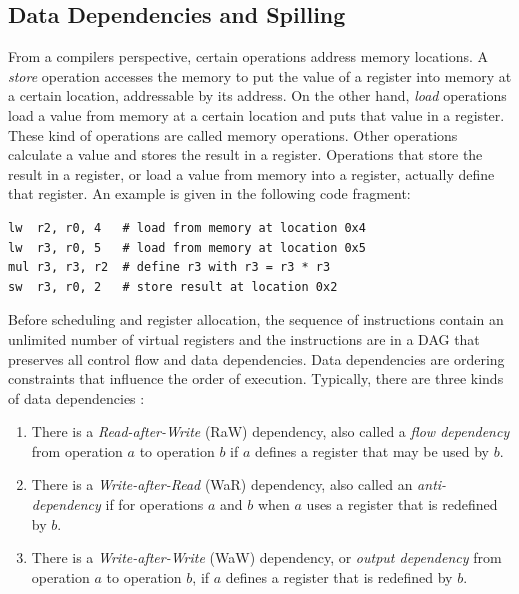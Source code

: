 
\subsection{Data Dependencies and Spilling}\label{sec:data_dependencies}
From a compilers perspective, certain operations address memory locations. A \emph{store} operation accesses the memory to put the value of a register into memory at a certain location, addressable by its address. On the other hand, \emph{load} operations load a value from memory at a certain location and puts that value in a register. These kind of operations are called memory operations. Other operations calculate a value and stores the result in a register. Operations that store the result in a register, or load a value from memory into a register, actually define that register. An example is given in the following code fragment:

\begin{lstlisting}
lw  r2, r0, 4   # load from memory at location 0x4
lw  r3, r0, 5   # load from memory at location 0x5
mul r3, r3, r2  # define r3 with r3 = r3 * r3
sw  r3, r0, 2   # store result at location 0x2
\end{lstlisting}

Before scheduling and register allocation, the sequence of instructions contain an unlimited number of virtual registers and the instructions are in a DAG that preserves all control flow and data dependencies. Data dependencies are ordering constraints that influence the order of execution. Typically, there are three kinds of data dependencies \cite{data_dependece}:
\begin{enumerate}
\item There is a \emph{Read-after-Write} (RaW) dependency, also called a \emph{flow dependency} from operation $a$ to operation $b$ if $a$ defines a register that may be used by $b$.
\item  There is a \emph{Write-after-Read} (WaR) dependency, also called an \emph{anti-dependency} if for operations $a$ and $b$ when $a$ uses a register that is redefined by $b$. 
\item There is a \emph{Write-after-Write} (WaW) dependency, or \emph{output dependency} from operation $a$ to operation $b$, if $a$ defines a register that is redefined by $b$.
\end{enumerate} 

